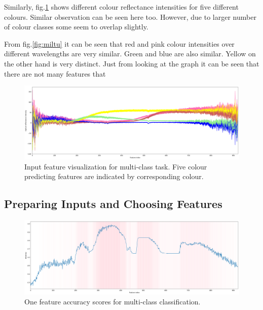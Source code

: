 \documentclass[11pt]{article}
\begin{document}
			Similarly, fig.\ref{fig:multi} shows different colour reflectance intensities for five different colours. Similar observation can be seen here too. However, due to larger number of colour classes some seem to overlap slightly. 

			From fig.\ref{fig:miltu} it can be seen that red and pink colour intensities over different wavelengths are very similar. Green and blue are also similar. Yellow on the other hand is very distinct. Just from looking at the graph it can be seen that there are not many features that 

			\begin{figure}[H]
				\includegraphics[width=1\textwidth]{png/multi_default}
				\caption{Input feature visualization for multi-class task. Five colour predicting features are indicated by corresponding colour.}
				\label{fig:multi}
			\end{figure}
		\subsection{Preparing Inputs and Choosing Features}
		\begin{figure}[H]
				\includegraphics[width=1\textwidth]{png/multi_one}
				\caption{One feature accuracy scores for multi-class classification.}
				\label{fig:multi_one}
		\end{figure}
\end{document}

